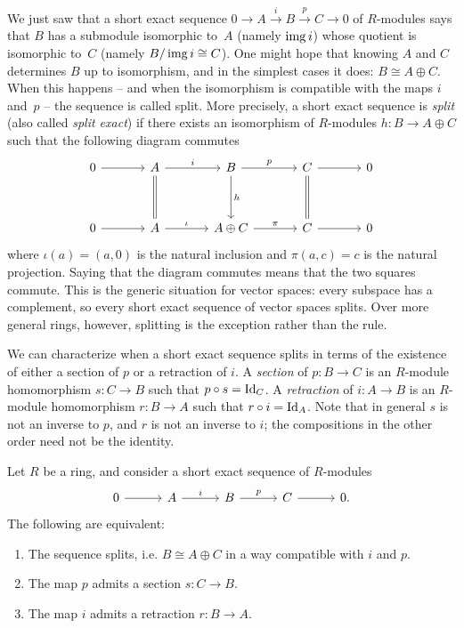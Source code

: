 \documentclass[Notebook.tex]{subfiles}
\begin{document}
We just saw that a short exact sequence $0\to A\xrightarrow{i}B\xrightarrow{p}C\to 0$ of $R$-modules says that $B$ has a submodule isomorphic to~$A$ (namely $\operatorname{img} i$) whose quotient is isomorphic to~$C$ (namely $B/\operatorname{img} i\cong C$). One might hope that knowing $A$ and $C$ determines $B$ up to isomorphism, and in the simplest cases it does: $B\cong A\oplus C$. When this happens -- and when the isomorphism is compatible with the maps $i$ and~$p$ -- the sequence is called split. More precisely, a short exact sequence is \emph{split} (also called \emph{split exact}) if there exists an isomorphism of $R$-modules $h:B \to A\oplus C$ such that the following diagram commutes
\[
\begin{tikzcd}[row sep = 3.5em, column sep = 3.5em]
0 \arrow[r] & A \arrow[r, "i"] \arrow[d, equals] & B \arrow[r, "p"] \arrow[d,"h"]& C \arrow[r] \arrow[d, equals] & 0 \\
0 \arrow[r] & A \arrow[r, "\iota"] & A\oplus C \arrow[r, "\pi"] & C \arrow[r] & 0
\end{tikzcd}
\]
where $\iota(a)=(a,0)$ is the natural inclusion and $\pi(a,c)=c$ is the natural projection. Saying that the diagram commutes means that the two squares commute. This is the generic situation for vector spaces: every subspace has a complement, so every short exact sequence of vector spaces splits.  Over more general rings, however, splitting is the exception rather than the rule. 

We can characterize when a short exact sequence splits in terms of the existence of either a section of $p$ or a retraction of $i$. A \emph{section} of $p:B \to C$ is an $R$-module homomorphism $s:C \to B$ such that $p \circ s = \operatorname{Id}_{C}$. A \emph{retraction} of $i:A \to B$ is an $R$-module homomorphism $r:B \to A$ such that $r \circ i = \operatorname{Id}_{A}$. Note that in general $s$ is not an inverse to $p$, and $r$ is not an inverse to $i$; the compositions in the other order need not be the identity.

\begin{lemma}
Let $R$ be a ring, and consider a short exact sequence of $R$-modules
\[
\begin{tikzcd}[row sep = .3em, column sep = 3em]
0 \arrow[r] & A \arrow[r, "i"] & B \arrow[r, "p"] & C \arrow[r] & 0.
\end{tikzcd}
\]
The following are equivalent:
\begin{enumerate}[label=(\roman*),ref=\theenumi\roman*]
\item The sequence splits, i.e. $B \cong A \oplus C$ in a way compatible with $i$ and $p$.
\item The map $p$ admits a section $s:C \to B$.
\item The map $i$ admits a retraction $r:B \to A$.
\end{enumerate}
\end{lemma}
\end{document}
